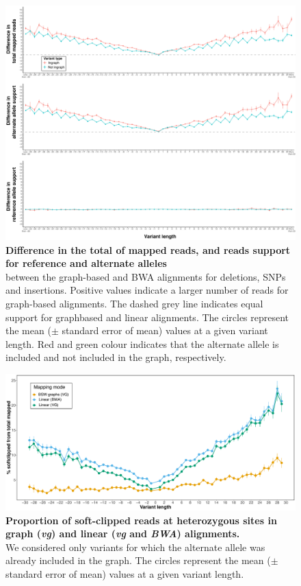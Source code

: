 \documentclass[../main.tex]{subfiles}
\begin{document}
\begin{flushleft}
\begin{figure}[!htb]
    \centering
    \includegraphics[width=\textwidth]{paper2/supplement/sp315.pdf}
    \caption[ Read support difference between reference and alternate alleles]{\textbf{Difference in the total of mapped reads, and reads support for
    reference and alternate alleles} \\
    \small{between the graph-based and BWA alignments for
    deletions, SNPs and insertions. Positive values indicate a larger number of reads for
    graph-based alignments. The dashed grey line indicates equal support for graphbased and linear alignments. The circles represent the mean ($\pm$ standard error of
    mean) values at a given variant length. Red and green colour indicates that the
    alternate allele is included and not included in the graph, respectively. }}
    \label{sup_fig:s315}
\end{figure}

\begin{figure}[!htb]
    \centering
    \includegraphics[width=\textwidth]{paper2/supplement/sp316.pdf}
    \caption[ Proportion of soft-clipped reads]{\textbf{Proportion of soft-clipped reads at heterozygous sites in graph
    (\emph{vg}) and linear (\emph{vg} and \emph{BWA}) alignments.} \\
    \small{We considered only variants for which
    the alternate allele was already included in the graph. The circles represent the
    mean ($\pm$ standard error of mean) values at a given variant length.}}
    \label{sup_fig:s316}
\end{figure}


\end{flushleft}
\end{document}

